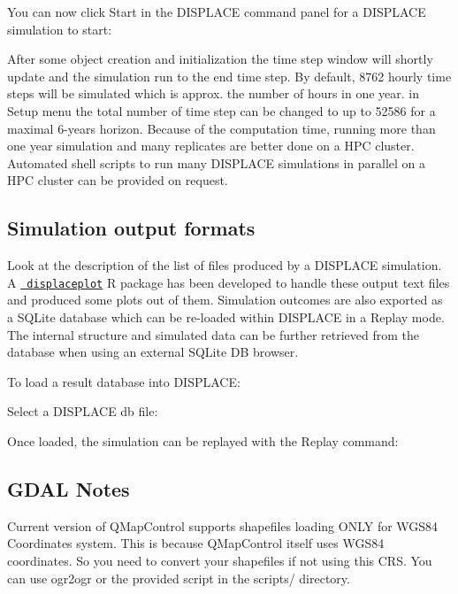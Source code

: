 You can now click Start in the D\+I\+S\+P\+L\+A\+CE command panel for a D\+I\+S\+P\+L\+A\+CE simulation to start\+:



After some object creation and initialization the time step window will shortly update and the simulation run to the end time step. By default, 8762 hourly time steps will be simulated which is approx. the number of hours in one year. in Setup menu the total number of time step can be changed to up to 52586 for a maximal 6-\/years horizon. Because of the computation time, running more than one year simulation and many replicates are better done on a H\+PC cluster. Automated shell scripts to run many D\+I\+S\+P\+L\+A\+CE simulations in parallel on a H\+PC cluster can be provided on request.

\subsection*{Simulation output formats}

Look at the description of the list of files produced by a D\+I\+S\+P\+L\+A\+CE simulation. A \href{https://github.com/frabas/displaceplot/releases}{\texttt{ displaceplot}} R package has been developed to handle these output text files and produced some plots out of them. Simulation outcomes are also exported as a S\+Q\+Lite database which can be re-\/loaded within D\+I\+S\+P\+L\+A\+CE in a Replay mode. The internal structure and simulated data can be further retrieved from the database when using an external S\+Q\+Lite DB browser.

To load a result database into D\+I\+S\+P\+L\+A\+CE\+:



Select a D\+I\+S\+P\+L\+A\+CE db file\+:



Once loaded, the simulation can be replayed with the Replay command\+:



\subsection*{G\+D\+AL Notes}

Current version of Q\+Map\+Control supports shapefiles loading O\+N\+LY for W\+G\+S84 Coordinates system. This is because Q\+Map\+Control itself uses W\+G\+S84 coordinates. So you need to convert your shapefiles if not using this C\+RS. You can use ogr2ogr or the provided script in the scripts/ directory.


